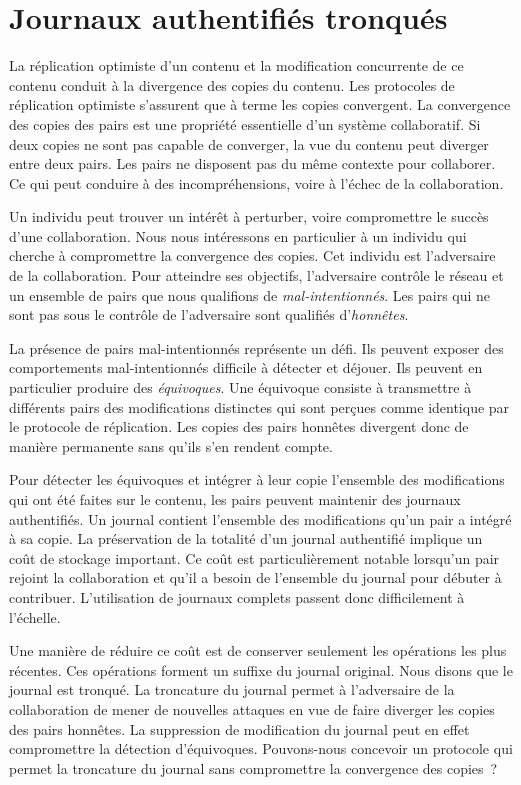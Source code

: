 
\chapter{Journaux authentifiés tronqués}\label{ch:pruned-log}

\minitoc{}
\bigskip


La réplication optimiste d'un contenu et la modification concurrente de ce contenu conduit à la divergence des copies du contenu.
Les protocoles de réplication optimiste s'assurent que à terme les copies convergent.
La convergence des copies des pairs est une propriété essentielle d'un système collaboratif.
Si deux copies ne sont pas capable de converger, la vue du contenu peut diverger entre deux pairs.
Les pairs ne disposent pas du même contexte pour collaborer.
Ce qui peut conduire à des incompréhensions, voire à l'échec de la collaboration.

Un individu peut trouver un intérêt à perturber, voire compromettre le succès d'une collaboration.
Nous nous intéressons en particulier à un individu qui cherche à compromettre la convergence des copies.
Cet individu est l'adversaire de la collaboration.
Pour atteindre ses objectifs, l'adversaire contrôle le réseau et un ensemble de pairs que nous qualifions de \emph{mal-intentionnés}.
Les pairs qui ne sont pas sous le contrôle de l'adversaire sont qualifiés d'\emph{honnêtes}.

La présence de pairs mal-intentionnés représente un défi.
Ils peuvent exposer des comportements mal-intentionnés difficile à détecter et déjouer.
Ils peuvent en particulier produire des \emph{équivoques}.
Une équivoque consiste à transmettre à différents pairs des modifications distinctes qui sont perçues comme identique par le protocole de réplication.
Les copies des pairs honnêtes divergent donc de manière permanente sans qu'ils s'en rendent compte.

Pour détecter les équivoques et intégrer à leur copie l'ensemble des modifications qui ont été faites sur le contenu, les pairs peuvent maintenir des journaux authentifiés.
Un journal contient l'ensemble des modifications qu'un pair a intégré à sa copie.
La préservation de la totalité d'un journal authentifié implique un coût de stockage important.
Ce coût est particulièrement notable lorsqu'un pair rejoint la collaboration et qu'il a besoin de l'ensemble du journal pour débuter à contribuer.
L'utilisation de journaux complets passent donc difficilement à l'échelle.

Une manière de réduire ce coût est de conserver seulement les opérations les plus récentes.
Ces opérations forment un suffixe du journal original.
Nous disons que le journal est tronqué.
La troncature du journal permet à l'adversaire de la collaboration de mener de nouvelles attaques en vue de faire diverger les copies des pairs honnêtes.
La suppression de modification du journal peut en effet compromettre la détection d'équivoques.
Pouvons-nous concevoir un protocole qui permet la troncature du journal sans compromettre la convergence des copies~?


